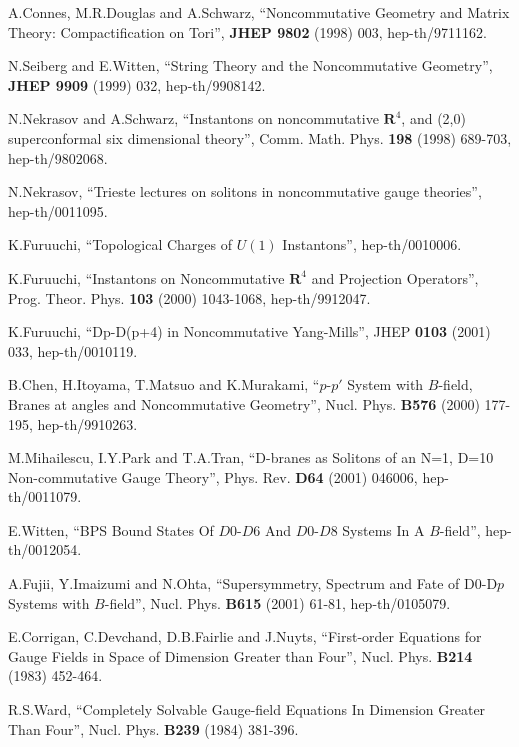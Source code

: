 \documentclass[a4paper,12pt]{article}
\begin{document}
\begin{thebibliography}{999}

A.Connes, M.R.Douglas and A.Schwarz, ``Noncommutative Geometry and Matrix
 Theory: Compactification on Tori'', \textbf{JHEP 9802} (1998) 003, 
hep-th/9711162.

N.Seiberg and E.Witten, ``String Theory and the Noncommutative Geometry'',
 \textbf{JHEP 9909} (1999) 032, hep-th/9908142.

N.Nekrasov and A.Schwarz, ``Instantons on noncommutative $\mathbf{R}^4$, and
 (2,0) superconformal six dimensional theory'', Comm. Math. Phys. \textbf{198}
 (1998) 689-703, hep-th/9802068.

N.Nekrasov, ``Trieste lectures on solitons in noncommutative gauge theories'',
 hep-th/0011095.

K.Furuuchi, ``Topological Charges of $U(1)$ Instantons'', hep-th/0010006.

K.Furuuchi, ``Instantons on Noncommutative $\mathbf{R}^4$ and Projection 
Operators'', Prog. Theor. Phys. \textbf{103} (2000) 1043-1068, hep-th/9912047.

K.Furuuchi, ``Dp-D(p+4) in Noncommutative Yang-Mills'', 
JHEP \textbf{0103} (2001) 033, hep-th/0010119.

B.Chen, H.Itoyama, T.Matsuo and K.Murakami, ``$p$-$p'$ System with $B$-field,
 Branes at angles and Noncommutative Geometry'', Nucl. Phys. \textbf{B576}
 (2000) 177-195, hep-th/9910263.

M.Mihailescu, I.Y.Park and T.A.Tran, 
``D-branes as Solitons of an N=1, D=10 Non-commutative Gauge Theory'', 
Phys. Rev. \textbf{D64} (2001) 046006, hep-th/0011079.

E.Witten, ``BPS Bound States Of $D0$-$D6$ And $D0$-$D8$ Systems 
In A $B$-field'',
 hep-th/0012054.

A.Fujii, Y.Imaizumi and N.Ohta, ``Supersymmetry, Spectrum and Fate of D0-D$p$ 
Systems with $B$-field'', Nucl. Phys. \textbf{B615} (2001) 61-81, 
hep-th/0105079.

E.Corrigan, C.Devchand, D.B.Fairlie and J.Nuyts, ``First-order Equations for
 Gauge Fields in Space of Dimension Greater than Four'', Nucl. Phys.
 \textbf{B214} (1983) 452-464.

R.S.Ward, ``Completely Solvable Gauge-field Equations In Dimension
Greater Than Four'', Nucl. Phys. \textbf{B239} (1984) 381-396.


\end{thebibliography}
\end{document}
